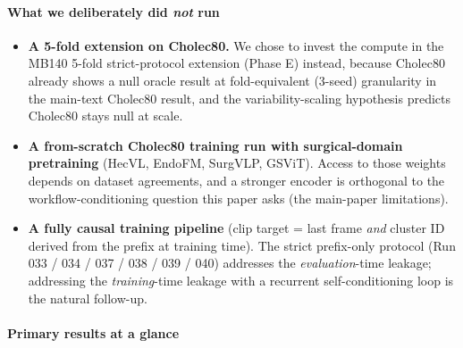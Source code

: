 \paragraph{\texorpdfstring{What we deliberately did \emph{not}
run}{What we deliberately did not run}}\label{what-we-deliberately-did-not-run}

\begin{itemize}
\tightlist
\item
  \textbf{A 5-fold extension on Cholec80.} We chose to invest the
  compute in the MB140 5-fold strict-protocol extension (Phase E)
  instead, because Cholec80 already shows a null oracle result at
  fold-equivalent (3-seed) granularity in the main-text Cholec80 result, and the
  variability-scaling hypothesis predicts Cholec80 stays null at scale.
\item
  \textbf{A from-scratch Cholec80 training run with surgical-domain
  pretraining} (HecVL, EndoFM, SurgVLP, GSViT). Access to those weights
  depends on dataset agreements, and a stronger encoder is orthogonal to
  the workflow-conditioning question this paper asks (the main-paper limitations).
\item
  \textbf{A fully causal training pipeline} (clip target = last frame
  \emph{and} cluster ID derived from the prefix at training time). The
  strict prefix-only protocol (Run 033 / 034 / 037 / 038 / 039 / 040)
  addresses the \emph{evaluation}-time leakage; addressing the
  \emph{training}-time leakage with a recurrent self-conditioning loop
  is the natural follow-up.
\end{itemize}

\paragraph{Primary results at a
glance}\label{primary-results-at-a-glance}

